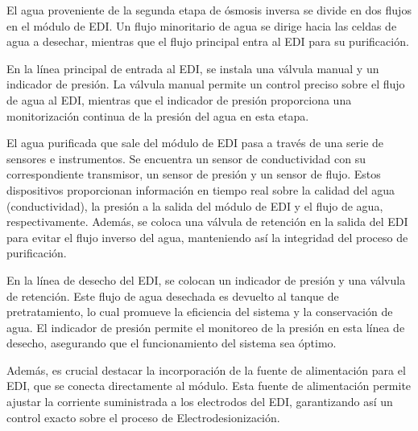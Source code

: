 El agua proveniente de la segunda etapa de ósmosis inversa se divide en dos flujos en el módulo de
EDI. Un flujo minoritario de agua se dirige hacia las celdas de agua a desechar, mientras que el flujo principal entra al EDI para su purificación.


En la línea principal de entrada al EDI, se instala una válvula manual y un indicador de presión. La válvula manual permite un control preciso sobre el flujo de agua al EDI, mientras que el indicador de presión proporciona una monitorización continua de la presión del agua en esta etapa.

El agua purificada que sale del módulo de EDI pasa a través de una serie de sensores e instrumentos. Se encuentra un sensor de conductividad con su correspondiente transmisor, un sensor de presión y un sensor de flujo. Estos dispositivos proporcionan información en tiempo real sobre la calidad del agua (conductividad), la presión a la salida del módulo de EDI y el flujo de agua, respectivamente. Además, se coloca una válvula de retención en la salida del EDI para evitar el flujo inverso del agua, manteniendo así la integridad del proceso de purificación.

En la línea de desecho del EDI, se colocan un indicador de presión y una válvula de retención. Este flujo de agua desechada es devuelto al tanque de pretratamiento, lo cual promueve la eficiencia del sistema y la conservación de agua. El indicador de presión permite el monitoreo de la presión en esta línea de desecho, asegurando que el funcionamiento del sistema sea óptimo.

Además, es crucial destacar la incorporación de la fuente de alimentación para el EDI, que se conecta directamente al módulo. Esta fuente de alimentación permite ajustar la corriente suministrada a los electrodos del EDI, garantizando así un control exacto sobre el proceso de Electrodesionización.
